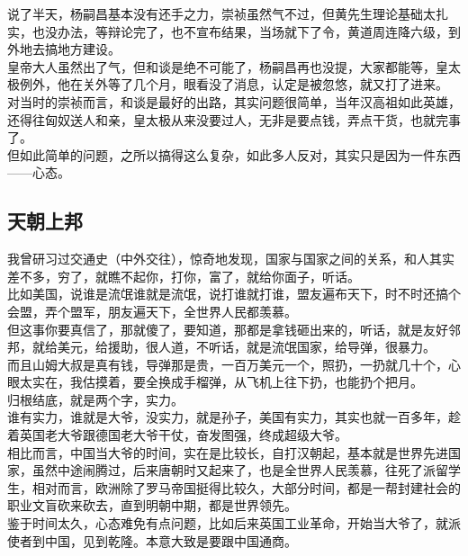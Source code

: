 \begin{multicols}{\theparacolNo}
说了半天，杨嗣昌基本没有还手之力，崇祯虽然气不过，但黄先生理论基础太扎实，也没办法，等辩论完了，也不宣布结果，当场就下了令，黄道周连降六级，到外地去搞地方建设。\\

皇帝大人虽然出了气，但和谈是绝不可能了，杨嗣昌再也没提，大家都能等，皇太极例外，他在关外等了几个月，眼看没了消息，认定是被忽悠，就又打了进来。\\

对当时的崇祯而言，和谈是最好的出路，其实问题很简单，当年汉高祖如此英雄，还得往匈奴送人和亲，皇太极从来没要过人，无非是要点钱，弄点干货，也就完事了。\\

但如此简单的问题，之所以搞得这么复杂，如此多人反对，其实只是因为一件东西——心态。\\

\subsection{天朝上邦}
我曾研习过交通史（中外交往），惊奇地发现，国家与国家之间的关系，和人其实差不多，穷了，就瞧不起你，打你，富了，就给你面子，听话。\\

比如美国，说谁是流氓谁就是流氓，说打谁就打谁，盟友遍布天下，时不时还搞个会盟，弄个盟军，朋友遍天下，全世界人民都羡慕。\\

但这事你要真信了，那就傻了，要知道，那都是拿钱砸出来的，听话，就是友好邻邦，就给美元，给援助，很人道，不听话，就是流氓国家，给导弹，很暴力。\\

而且山姆大叔是真有钱，导弹那是贵，一百万美元一个，照扔，一扔就几十个，心眼太实在，我估摸着，要全换成手榴弹，从飞机上往下扔，也能扔个把月。\\

归根结底，就是两个字，实力。\\

谁有实力，谁就是大爷，没实力，就是孙子，美国有实力，其实也就一百多年，趁着英国老大爷跟德国老大爷干仗，奋发图强，终成超级大爷。\\

相比而言，中国当大爷的时间，实在是比较长，自打汉朝起，基本就是世界先进国家，虽然中途闹腾过，后来唐朝时又起来了，也是全世界人民羡慕，往死了派留学生，相对而言，欧洲除了罗马帝国挺得比较久，大部分时间，都是一帮封建社会的职业文盲砍来砍去，直到明朝中期，都是世界领先。\\

鉴于时间太久，心态难免有点问题，比如后来英国工业革命，开始当大爷了，就派使者到中国，见到乾隆。本意大致是要跟中国通商。\\


\end{multicols}
